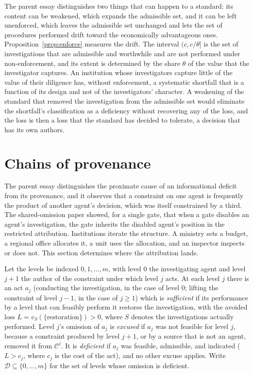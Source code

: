 \documentclass[11pt]{article}
\newcommand{\C}{\mathcal C}
\newcommand{\Dfc}{\mathcal D}
\theoremstyle{plain}
\theoremstyle{definition}
\begin{document}
The parent essay distinguishes two things that can happen to a standard: its content can be weakened, which expands the admissible set, and it can be left unenforced, which leaves the admissible set unchanged and lets the set of procedures performed drift toward the economically advantageous ones. Proposition~\ref{prop:enforce} measures the drift. The interval $(c,c/\theta]$ is the set of investigations that are admissible and worthwhile and are not performed under non-enforcement, and its extent is determined by the share $\theta$ of the value that the investigator captures. An institution whose investigators capture little of the value of their diligence has, without enforcement, a systematic shortfall that is a function of its design and not of the investigators' character. A weakening of the standard that removed the investigation from the admissible set would eliminate the shortfall's classification as a deficiency without recovering any of the loss, and the loss is then a loss that the standard has decided to tolerate, a decision that has its own authors.

\section{Chains of provenance}\label{sec:chain}

The parent essay distinguishes the proximate cause of an informational deficit from its provenance, and it observes that a constraint on one agent is frequently the product of another agent's decision, which was itself constrained by a third. The shared-omission paper \cite{flyxion2026shared} showed, for a single gate, that when a gate disables an agent's investigation, the gate inherits the disabled agent's position in the restricted attribution. Institutions iterate the structure. A ministry sets a budget, a regional office allocates it, a unit uses the allocation, and an inspector inspects or does not. This section determines where the attribution lands.

Let the levels be indexed $0,1,\dots,m$, with level $0$ the investigating agent and level $j+1$ the author of the constraint under which level $j$ acts. At each level $j$ there is an act $a_j$ (conducting the investigation, in the case of level $0$; lifting the constraint of level $j-1$, in the case of $j\ge1$) which is \emph{sufficient} if its performance by a level that can feasibly perform it restores the investigation, with the avoided loss $L=v_S(\{\text{restoration}\})>0$, where $S$ denotes the investigations actually performed. Level $j$'s omission of $a_j$ is \emph{excused} if $a_j$ was not feasible for level $j$, because a constraint produced by level $j+1$, or by a source that is not an agent, removed it from $\C^j$. It is \emph{deficient} if $a_j$ was feasible, admissible, and indicated ($L>c_j$, where $c_j$ is the cost of the act), and no other excuse applies. Write $\Dfc\subseteq\{0,\dots,m\}$ for the set of levels whose omission is deficient.
\end{document}
